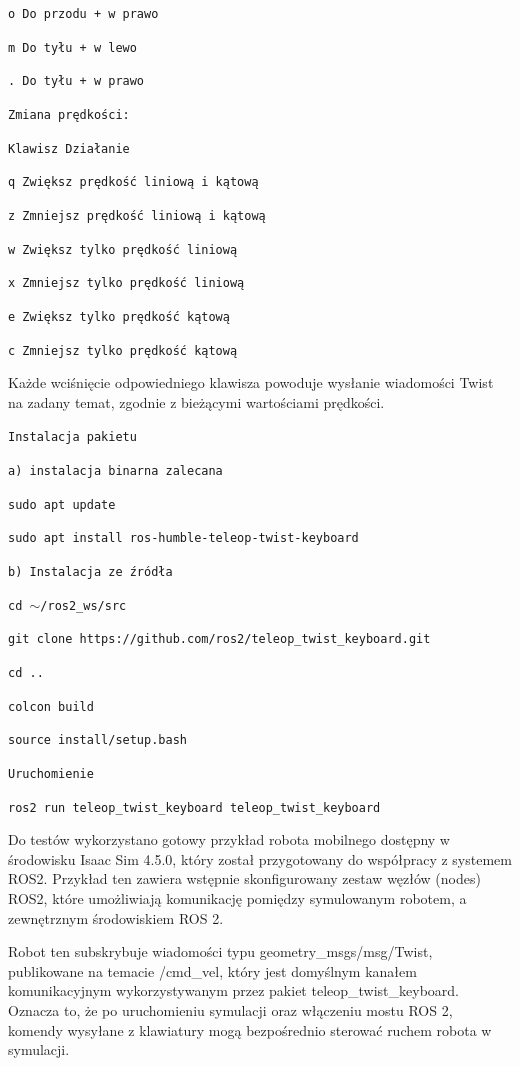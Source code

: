 \documentclass[12pt]{article}
\begin{document}
\texttt{o  Do przodu + w prawo}

\texttt{m  Do tyłu + w lewo}

\texttt{.  Do tyłu + w prawo}
 
\texttt{Zmiana prędkości:}

\texttt{Klawisz  Działanie}

\texttt{q  Zwiększ prędkość liniową i kątową}

\texttt{z  Zmniejsz prędkość liniową i kątową}

\texttt{w  Zwiększ tylko prędkość liniową}

\texttt{x  Zmniejsz tylko prędkość liniową}

\texttt{e  Zwiększ tylko prędkość kątową}

\texttt{c  Zmniejsz tylko prędkość kątową}

Każde wciśnięcie odpowiedniego klawisza powoduje wysłanie wiadomości Twist na zadany temat, zgodnie z bieżącymi wartościami prędkości.

\texttt{Instalacja pakietu}

\texttt{a) instalacja binarna zalecana}

\texttt{sudo apt update}

\texttt{sudo apt install ros-humble-teleop-twist-keyboard}

\texttt{b) Instalacja ze źródła}

\texttt{cd $\sim$/ros2\_ws/src}

\texttt{git clone https://github.com/ros2/teleop\_twist\_keyboard.git}

\texttt{cd ..}

\texttt{colcon build}

\texttt{source install/setup.bash}

\texttt{Uruchomienie}

\texttt{ros2 run teleop\_twist\_keyboard teleop\_twist\_keyboard}

Do testów wykorzystano gotowy przykład robota mobilnego dostępny w środowisku Isaac Sim 4.5.0, który został przygotowany do współpracy z systemem ROS2. Przykład ten zawiera wstępnie skonfigurowany zestaw węzłów (nodes) ROS2, które umożliwiają komunikację pomiędzy symulowanym robotem, a zewnętrznym środowiskiem ROS 2.

Robot ten subskrybuje wiadomości typu geometry\_msgs/msg/Twist, publikowane na temacie /cmd\_vel, który jest domyślnym kanałem komunikacyjnym wykorzystywanym przez pakiet teleop\_twist\_keyboard. Oznacza to, że po uruchomieniu symulacji oraz włączeniu mostu ROS 2, komendy wysyłane z klawiatury mogą bezpośrednio sterować ruchem robota w symulacji.
\end{document}
